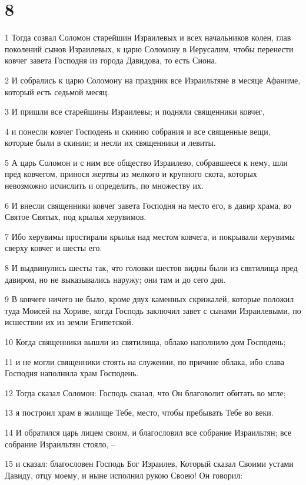\chapter{8}

\par 1 Тогда созвал Соломон старейшин Израилевых и всех начальников колен, глав поколений сынов Израилевых, к царю Соломону в Иерусалим, чтобы перенести ковчег завета Господня из города Давидова, то есть Сиона.
\par 2 И собрались к царю Соломону на праздник все Израильтяне в месяце Афаниме, который есть седьмой месяц.
\par 3 И пришли все старейшины Израилевы; и подняли священники ковчег,
\par 4 и понесли ковчег Господень и скинию собрания и все священные вещи, которые были в скинии; и несли их священники и левиты.
\par 5 А царь Соломон и с ним все общество Израилево, собравшееся к нему, шли пред ковчегом, принося жертвы из мелкого и крупного скота, которых невозможно исчислить и определить, по множеству их.
\par 6 И внесли священники ковчег завета Господня на место его, в давир храма, во Святое Святых, под крылья херувимов.
\par 7 Ибо херувимы простирали крылья над местом ковчега, и покрывали херувимы сверху ковчег и шесты его.
\par 8 И выдвинулись шесты так, что головки шестов видны были из святилища пред давиром, но не выказывались наружу; они там и до сего дня.
\par 9 В ковчеге ничего не было, кроме двух каменных скрижалей, которые положил туда Моисей на Хориве, когда Господь заключил завет с сынами Израилевыми, по исшествии их из земли Египетской.
\par 10 Когда священники вышли из святилища, облако наполнило дом Господень;
\par 11 и не могли священники стоять на служении, по причине облака, ибо слава Господня наполнила храм Господень.
\par 12 Тогда сказал Соломон: Господь сказал, что Он благоволит обитать во мгле;
\par 13 я построил храм в жилище Тебе, место, чтобы пребывать Тебе во веки.
\par 14 И обратился царь лицем своим, и благословил все собрание Израильтян; все собрание Израильтян стояло, --
\par 15 и сказал: благословен Господь Бог Израилев, Который сказал Своими устами Давиду, отцу моему, и ныне исполнил рукою Своею! Он говорил:
